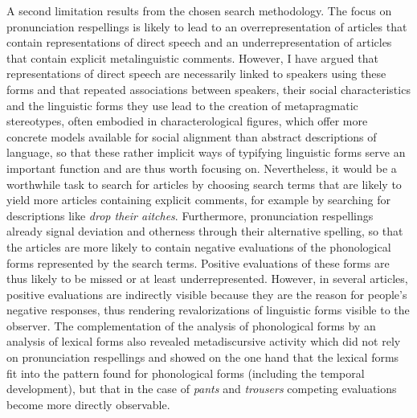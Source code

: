 A second limitation results from the chosen search methodology. The focus on pronunciation respellings is likely to lead to an overrepresentation of articles that contain representations of direct speech and an underrepresentation of articles that contain explicit metalinguistic comments. However, I have argued that representations of direct speech are necessarily linked to speakers using these forms and that repeated associations between speakers, their social characteristics and the linguistic forms they use lead to the creation of metapragmatic stereotypes, often embodied in characterological figures, which offer more concrete models available for social alignment than abstract descriptions of language, so that these rather implicit ways of typifying linguistic forms serve an important function and are thus worth focusing on. Nevertheless, it would be a worthwhile task to search for articles by choosing search terms that are likely to yield more articles containing explicit comments, for example by searching for descriptions like \emph{drop their aitches}. Furthermore, pronunciation respellings already signal deviation and otherness through their alternative spelling, so that the articles are more likely to contain negative evaluations of the phonological forms represented by the search terms. Positive evaluations of these forms are thus likely to be missed or at least underrepresented. However, in several articles, positive evaluations are indirectly visible because they are the reason for people’s negative responses, thus rendering revalorizations of linguistic forms visible to the observer. The complementation of the analysis of phonological forms by an analysis of lexical forms also revealed metadiscursive activity which did not rely on pronunciation respellings and showed on the one hand that the lexical forms fit into the pattern found for phonological forms (including the temporal development), but that in the case of \emph{pants} and \emph{trousers} competing evaluations become more directly observable.

